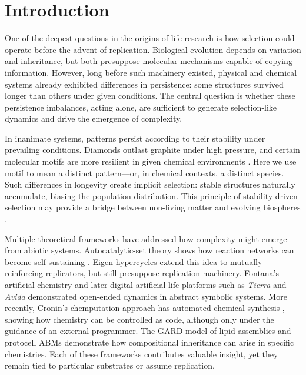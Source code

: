 \documentclass[life,article,submit,pdftex,moreauthors]{Definitions/mdpi}
\begin{document}
\section{Introduction}

One of the deepest questions in the origins of life research is how selection could operate before the advent of replication. Biological evolution depends on variation and inheritance, but both presuppose molecular mechanisms capable of copying information. However, long before such machinery existed, physical and chemical systems already exhibited differences in persistence: some structures survived longer than others under given conditions. The central question is whether these persistence imbalances, acting alone, are sufficient to generate selection-like dynamics and drive the emergence of complexity.

In inanimate systems, patterns persist according to their stability under prevailing conditions. Diamonds outlast graphite under high pressure, and certain molecular motifs are more resilient in given chemical environments \cite{ruizmirazo2014}. Here we use motif to mean a distinct pattern—or, in chemical contexts, a distinct species. Such differences in longevity create implicit selection: stable structures naturally accumulate, biasing the population distribution. This principle of stability-driven selection may provide a bridge between non-living matter and evolving biospheres \cite{kauffman1993origins, hordijk2012autocatalytic, nghe2015prebiotic}.

Multiple theoretical frameworks have addressed how complexity might emerge from abiotic systems. Autocatalytic-set theory shows how reaction networks can become self-sustaining \cite{kauffman1986autocatalytic, hordijk2011required}. Eigen hypercycles \cite{eigen} extend this idea to mutually reinforcing replicators, but still presuppose replication machinery. Fontana's artificial chemistry \cite{fontana1991algorithmic} and later digital artificial life platforms such as \textit{Tierra} and \textit{Avida} \cite{ray1992tierra, adami1994} demonstrated open-ended dynamics in abstract symbolic systems. More recently, Cronin’s chemputation approach has automated chemical synthesis \cite{cronin2024chemputation}, showing how chemistry can be controlled as code, although only under the guidance of an external programmer. The GARD model of lipid assemblies \cite{segre2000compositional, markovitch2012universal} and protocell ABMs \cite{damer2015coupled} demonstrate how compositional inheritance can arise in specific chemistries. Each of these frameworks contributes valuable insight, yet they remain tied to particular substrates or assume replication.
\end{document}
